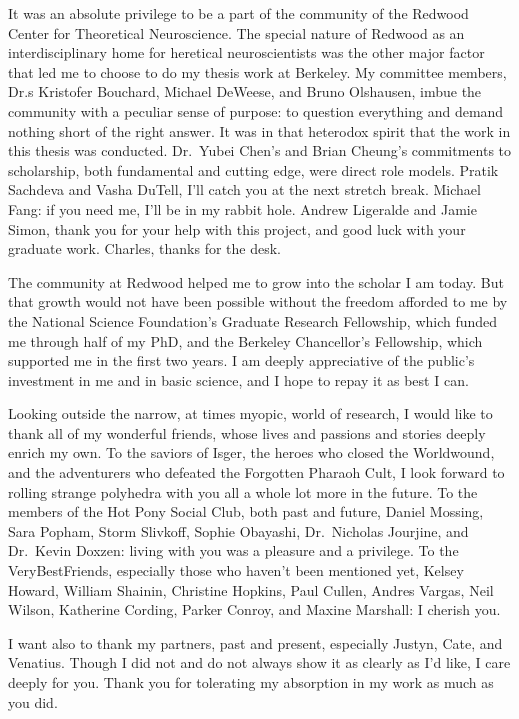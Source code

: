 \begin{frontmatter}
\begin{acknowledgements}
	It was an absolute privilege to
	be a part of the community of the
	Redwood Center for Theoretical Neuroscience.
	The special nature of Redwood as an
	interdisciplinary home for heretical
	neuroscientists was the other major factor
	that led me to choose to do my thesis work at Berkeley.
	My committee members,
	Dr.s Kristofer Bouchard,
	Michael DeWeese,
	and Bruno Olshausen,
	imbue the community with a peculiar sense of purpose:
	to question everything and demand nothing short
	of the right answer.
	It was in that heterodox spirit that
	the work in this thesis was conducted.
	Dr.\ Yubei Chen's and Brian Cheung's commitments
	to scholarship, both fundamental and cutting edge,
	were direct role models.
	Pratik Sachdeva and Vasha DuTell,
	I'll catch you at the next stretch break.
	Michael Fang: if you need me,
	I'll be in my rabbit hole.
	Andrew Ligeralde and Jamie Simon,
	thank you for your help with this project,
	and good luck with your graduate work.
	Charles, thanks for the desk.

	The community at Redwood helped me
	to grow into the scholar I am today.
	But that growth would not have been possible
	without the freedom afforded to me by the
	National Science Foundation's
	Graduate Research Fellowship,
	which funded me through half of my PhD,
	and the Berkeley Chancellor's Fellowship,
	which supported me in the first two years.
	I am deeply appreciative
	of the public's investment in me
	and in basic science,
	and I hope to repay it as best I can.

	Looking outside the narrow, at times myopic,
	world of research,
	I would like to thank all of my wonderful friends,
	whose lives and passions and stories
	deeply enrich my own.
	To the saviors of Isger,
	the heroes who closed the Worldwound,
	and the adventurers who defeated the Forgotten Pharaoh Cult,
	I look forward to rolling strange polyhedra
	with you all a whole lot more in the future.
	To the members of the Hot Pony Social Club,
	both past and future,
	Daniel Mossing, Sara Popham, Storm Slivkoff,
	Sophie Obayashi, Dr.\ Nicholas Jourjine,
	and Dr.\ Kevin Doxzen:
	living with you was a pleasure and a privilege.
	To the VeryBestFriends,
	especially those who haven't been mentioned yet,
	Kelsey Howard, William Shainin, Christine Hopkins,
	Paul Cullen, Andres Vargas, Neil Wilson, Katherine Cording,
	Parker Conroy, and Maxine Marshall:
	I cherish you.

	I want also to thank my partners, past and present,
	especially Justyn, Cate, and Venatius.
	Though I did not and do not always show it
	as clearly as I'd like,
	I care deeply for you.
	Thank you for tolerating my absorption in my work
	as much as you did.


\end{acknowledgements}

\end{frontmatter}
